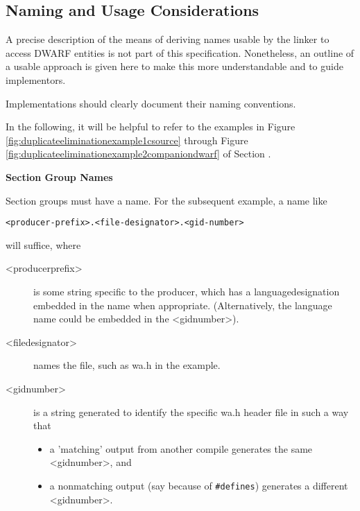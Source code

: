 \subsection{Naming and Usage Considerations}
\label{app:namingandusageconsiderations}

A precise description of the means of deriving names usable
by the linker to access DWARF entities is not part of this
specification. Nonetheless, an outline of a usable approach
is given here to make this more understandable and to guide
implementors.

Implementations should clearly document their naming conventions.

In the following, it will be helpful to refer to the examples
in 
Figure \ref{fig:duplicateeliminationexample1csource}
through 
Figure \ref{fig:duplicateeliminationexample2companiondwarf}
of 
Section .

\textbf{Section Group Names}

Section groups must have a  name.
For the subsequent 
 example, a name like
\begin{alltt}
    <producer-prefix>.<file-designator>.<gid-number>
\end{alltt}
will suffice, where

\begin{description}

\item  [\textless producer\dash prefix\textgreater] 
is some string specific to the
producer, which has a language\dash designation embedded in the
name when appropriate. (Alternatively, the language name
could be embedded in the 
\textless gid\dash number\textgreater).


\item  [\textless file\dash designator\textgreater]
names the file, such as wa.h in
the example.


\item  [\textless gid\dash number\textgreater]
is a string generated to identify the
specific wa.h header file in such a way that

\begin{itemize}

\item  a 'matching' output from another compile generates
the same 
\textless gid\dash number\textgreater,
and

\item  a non\dash matching output (say because of \texttt{\#defines})
generates a different 
\textless gid\dash number\textgreater.
\end{itemize}

\end{description}

